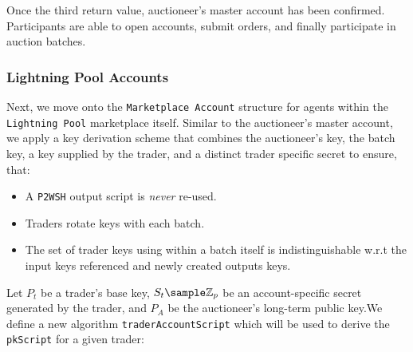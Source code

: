 \documentclass[10pt,a4paper]{article}
\theoremstyle{definition}
\begin{document}
Once the third return value, auctioneer's master account has been confirmed.
Participants are able to open accounts, submit orders, and finally participate
in auction batches.


\subsubsection{Lightning Pool Accounts}

Next, we move onto the \texttt{Marketplace Account} structure for agents within
the \texttt{Lightning Pool} marketplace itself. Similar to the auctioneer's
master account, we apply a key derivation scheme that combines the auctioneer's
key, the batch key, a key supplied by the trader, and a distinct trader
specific secret to ensure, that: 
\begin{itemize}
    \item A \texttt{P2WSH} output script is \emph{never} re-used.
    \item Traders rotate keys with each batch.
    \item The set of trader keys using within a batch itself is
        indistinguishable w.r.t the input keys referenced and newly created
        outputs keys.
\end{itemize}

Let $P_{t}$ be a trader's base key, $S_{t} \sample \mathbb{Z}_{p}$ be an
account-specific secret generated by the trader, and $P_{A}$ be the
auctioneer's long-term public key.We define a new algorithm
\texttt{traderAccountScript} which will be used to derive the \texttt{pkScript}
for a given trader:

\begin{pcvstack}[boxed,center, space=1em]
\end{pcvstack} 
\end{document}
